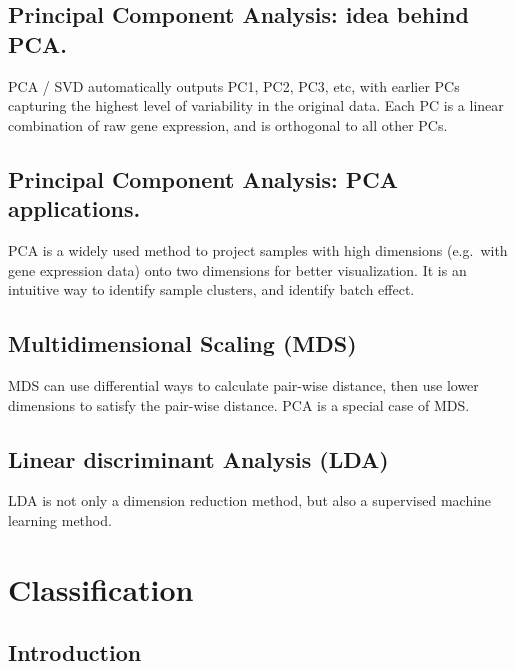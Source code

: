 \documentclass[
]{book}
\begin{document}
\hypertarget{principal-component-analysis-idea-behind-pca.}{%
\section{Principal Component Analysis: idea behind PCA.}\label{principal-component-analysis-idea-behind-pca.}}

PCA / SVD automatically outputs PC1, PC2, PC3, etc, with earlier PCs capturing the highest level of variability in the original data. Each PC is a linear combination of raw gene expression, and is orthogonal to all other PCs.

\hypertarget{principal-component-analysis-pca-applications.}{%
\section{Principal Component Analysis: PCA applications.}\label{principal-component-analysis-pca-applications.}}

PCA is a widely used method to project samples with high dimensions (e.g.~with gene expression data) onto two dimensions for better visualization. It is an intuitive way to identify sample clusters, and identify batch effect.

\hypertarget{multidimensional-scaling-mds}{%
\section{Multidimensional Scaling (MDS)}\label{multidimensional-scaling-mds}}

MDS can use differential ways to calculate pair-wise distance, then use lower dimensions to satisfy the pair-wise distance. PCA is a special case of MDS.

\hypertarget{linear-discriminant-analysis-lda}{%
\section{Linear discriminant Analysis (LDA)}\label{linear-discriminant-analysis-lda}}

LDA is not only a dimension reduction method, but also a supervised machine learning method.

\hypertarget{ml}{%
\chapter{Classification}\label{ml}}

\hypertarget{introduction-1}{%
\section{Introduction}\label{introduction-1}}
\end{document}
